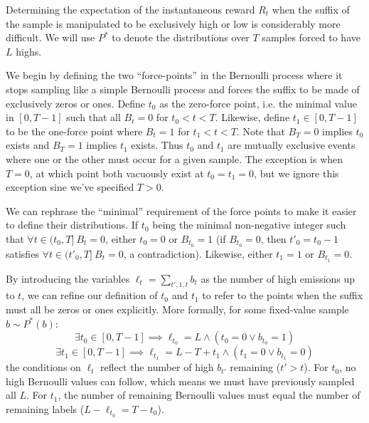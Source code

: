 \documentclass{article}
\begin{document}
Determining the expectation of the instantaneous reward $R_t$ when the suffix
of the sample is manipulated to be exclusively high or low is considerably
more difficult. We will use $P^*$ to denote the distributions over $T$ samples
forced to have $L$ highs.

We begin by defining the two ``force-points'' in the Bernoulli process where it
stops sampling like a simple Bernoulli process and forces the suffix to be made
of exclusively zeros or ones. Define $t_0$ as the zero-force point, i.e. the
minimal value in $[0, T - 1]$ such that all $B_t = 0$ for $t_0 < t < T$.
Likewise, define $t_1 \in [0, T - 1]$ to be the one-force point where $B_t = 1$
for $t_1 < t < T$. Note that $B_T = 0$ implies $t_0$ exists and $B_T = 1$
implies $t_1$ exists. Thus $t_0$ and $t_1$ are mutually exclusive events where
one or the other must occur for a given sample. The exception is when $T = 0$,
at which point both vacuously exist at $t_0 = t_1 = 0$, but we ignore this
exception sine we've specified $T > 0$.

We can rephrase the ``minimal'' requirement of the force points to make it
easier to define their distributions. If $t_0$ being the minimal non-negative
integer such that $\forall t \in (t_0, T] \> B_t = 0$, either $t_0 = 0$ or
$B_{t_0} = 1$ (if $B_{t_0} = 0$, then $t'_0 = t_0 - 1$ satisfies $\forall t \in
(t'_0, T] \> B_t = 0$, a contradiction). Likewise, either $t_1 = 1$ or $B_{t_1}
= 0$.

By introducing the variables $\ell_t = \sum_{t',1,t} b_t$ as the number of high
emissions up to $t$, we can refine our definition of $t_0$ and $t_1$ to refer
to the points when the suffix must all be zeros or ones explicitly. More
formally, for some fixed-value sample $b \sim P^*(b)$:
%
\begin{equation} \label{eq:iid_t0}
    \exists t_0 \in [0, T - 1] \implies \ell_{t_0} = L \land
                                        \left(t_0 = 0 \lor b_{t_0} = 1\right)
\end{equation}
%
\begin{equation} \label{eq:iid_t1}
    \exists t_1 \in [0, T - 1] \implies \ell_{t_1} = L - T + t_1 \land
                                        \left(t_1 = 0 \lor b_{t_1} = 0\right)
\end{equation}
%
the conditions on $\ell_t$ reflect the number of high $b_{t'}$ remaining ($t' >
t$). For $t_0$, no high Bernoulli values can follow, which means we must have
previously sampled all $L$. For $t_1$, the number of remaining Bernoulli values
must equal the number of remaining labels ($L - \ell_{t_0} = T - t_0$).
\end{document}
